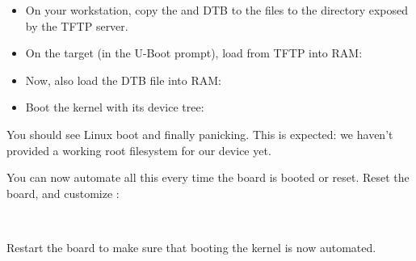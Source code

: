 \begin{itemize}

\item On your workstation, copy the  and DTB to the
files to the directory exposed by the TFTP server.

\item On the target (in the U-Boot prompt), load  from
TFTP into RAM:
{}
{}

\item Now, also load the DTB file into RAM:\\
{}
{}

\item Boot the kernel with its device tree:\\
{}
{}

\end{itemize}

You should see Linux boot and finally panicking. This is expected: we
haven't provided a working root filesystem for our device yet.

You can now automate all this every time the board is booted or
reset. Reset the board, and customize :

\scriptsize
{}
{
\\
}
\normalsize

Restart the board to make sure that booting the kernel is now automated.


